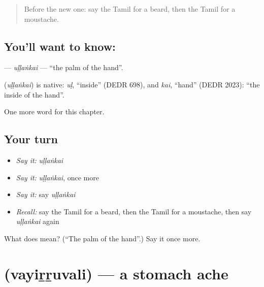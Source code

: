 \label{lesson:TA-C201-ullankai}



\begin{quote}
Before the new one: say the Tamil for a beard, then the Tamil for a moustache.
\end{quote}

\subsection*{You'll want to know: }
\textbf{} — \emph{uḷḷaṅkai} — \textquotedblleft{}the palm of the hand\textquotedblright{}.

\begin{cousinweb}
\textbf{} (\emph{uḷḷaṅkai}) is native: \emph{uḷ}, \textquotedblleft{}inside\textquotedblright{} (DEDR 698), and \emph{kai}, \textquotedblleft{}hand\textquotedblright{} (DEDR 2023): \textquotedblleft{}the inside of the hand\textquotedblright{}.
\end{cousinweb}

\begin{grammarlens}[title={What you've built}]
One more word for this chapter.
\end{grammarlens}

\subsection*{Your turn}
\begin{itemize}
\raggedright
  \item \emph{Say it:} \emph{uḷḷaṅkai}
  \item \emph{Say it:} \emph{uḷḷaṅkai}, once more
  \item \emph{Say it:} say \emph{uḷḷaṅkai}
  \item \emph{Recall:} say the Tamil for a beard, then the Tamil for a moustache, then say \emph{uḷḷaṅkai} again
\end{itemize}

\begin{tcolorbox}[breakable,colback=teal!4,colframe=teal!35!black,title={Before you move on}]
What does  mean? (\textquotedblleft{}The palm of the hand\textquotedblright{}.) Say it once more.
\end{tcolorbox}
\section[\texorpdfstring{\ta{வயிற்றுவலி} (vayiṟṟuvali)}{வயிற்றுவலி (vayiṟṟuvali)}]{ (vayiṟṟuvali) — a stomach ache}

